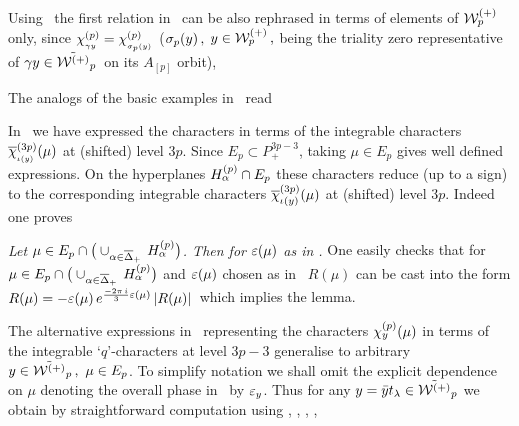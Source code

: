  Using \afsc\ the first relation in \qinvo\ can be also 
rephrased in terms of
elements of ${\cal W}^{(+)}_p$ only,  since $\chi_{_{\gamma y}}^{(p)} =
\chi_{_{\sigma_p(y)}}^{(p)}$ ($\sigma_p(y)\,,$ $y\in {\cal W}^{(+)}_p\,,  $ being the 
triality zero 
representative of $\gamma y\in \tilde{{\cal W}^{(+)}}_p\,$ on its $A_{[p]}$ orbit),
%
\eqn{}
%

The analogs of the basic examples in \fc\ read
%
\eqn{}
%

In \qfI\ we have expressed  the characters in terms of the
integrable characters $\overline{\chi}_{_{\iota(y)}}^{(3p)}(\mu)$ at (shifted)
level  $3p$. Since $E_p\subset P_+^{3p-3}$, taking $\mu\in E_p$
gives well defined expressions.  On the hyperplanes
$H_{\alpha}^{(p)}\cap E_p$ these characters reduce (up to a sign) to
the corresponding integrable characters $
\overline{\chi}_{\iota(y)}^{(3 p)}(\mu)$ at (shifted) level  $3p$.
Indeed one proves

 {\it Let $\mu\in E_p\cap \big(\cup_{\alpha\in
\overline\Delta_+}\,H_{\alpha}^{(p)}\big)$.
Then 
%
\eqn{}
%
for $\varepsilon(\mu)$ as in \sg.}
%
\PROOF
One easily checks  that for $\mu\in E_p\cap \big(\cup_{\alpha\in
\overline\Delta_+}\,H_{\alpha}^{(p)}\big)$ and $\varepsilon(\mu)$ chosen as in \sg\
$R(\mu)$ can be cast into the form
$R(\mu)=-\varepsilon(\mu)\,e^{{-2\pi \,i\over 3} \varepsilon(\mu)}\, |R(\mu)|\,$
which implies the lemma. 
\endPROOF

The alternative expressions in \qfI\ representing the characters
$\chi_y^{(p)}(\mu)$ in terms of the integrable `$q$'-characters at
level $3p-3$ generalise to arbitrary $y\in \tC_p\,, \ \mu\in
E_p$. To simplify notation we shall omit the explicit dependence
on $\mu$ denoting the overall phase in \qfch\ by $\varepsilon_y$.  Thus
for any $y=\bar y t_{\lambda}\in \tilde{{\cal W}^{(+)}}_p$ we obtain by straightforward
computation using  \froot, \rrela, \rrel, \qfI,  

